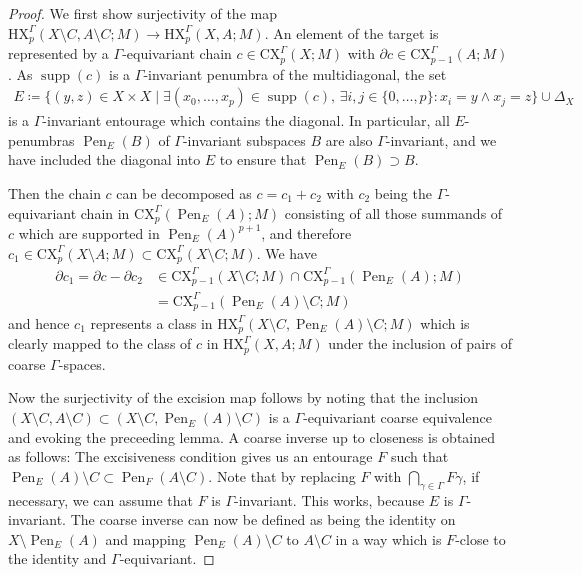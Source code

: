 \documentclass[pdftex]{sigma}
\numberwithin{equation}{section}
\theoremstyle{definition}
\newcommand{\Diag}[1][]{{\Delta_{#1}}}
\DeclareMathOperator{\supp}{supp}
\DeclareMathOperator{\Pen}{Pen}
\newcommand{\HX}{\mathrm{HX}}
\newcommand{\CX}{\mathrm{CX}}
\begin{document}
\begin{proof}
We first show surjectivity of the map \(\HX^\Gamma_p(X\setminus C,A\setminus C;M)\to\HX^\Gamma_p(X,A;M)\). An element of the target is represented by a $\Gamma$-equivariant chain $c\in\CX^\Gamma_p(X;M)$ with $\partial c\in \CX^\Gamma_{p-1}(A;M)$. As $\supp(c)$ is a $\Gamma$-invariant penumbra of the multidiagonal, the set
\begin{align*}
E\coloneqq\{(y,z)\in X\times X\mid \exists (x_0,\dots,x_p)\in \supp(c),\,
\exists i,j\in\{0,\dots,p\}\colon x_i=y\wedge x_j=z\}\cup\Diag[X]
\end{align*}
is a $\Gamma$-invariant entourage which contains the diagonal. In particular, all $E$-penumbras $\Pen_E(B)$ of $\Gamma$-invariant subspaces $B$ are also $\Gamma$-invariant, and we have included the diagonal into $E$ to ensure that $\Pen_E(B)\supset B$.

Then the chain $c$ can be decomposed as $c=c_1+c_2$ with $c_2$ being the $\Gamma$-equivariant chain in $\CX^\Gamma_p(\Pen_E(A);M)$ consisting of all those summands of $c$ which are supported in $\Pen_E(A)^{p+1}$, and therefore $c_1\in\CX^\Gamma_p(X\setminus A;M)\subset \CX^\Gamma_p(X\setminus C;M)$.
We have
\begin{align*}
\partial c_1=\partial c-\partial c_2 &\in \CX^\Gamma_{p-1}(X\setminus C;M)\cap\CX^\Gamma_{p-1}(\Pen_E(A);M)
\\&= \CX^\Gamma_{p-1}(\Pen_E(A)\setminus C;M)
\end{align*}
and hence $c_1$ represents a class in
\(\HX^\Gamma_p(X\setminus C,\Pen_E(A)\setminus C;M)\)
which is clearly mapped to the class of $c$ in $\HX^\Gamma_p(X,A;M)$ under the inclusion of pairs of coarse $\Gamma$-spaces.

Now the surjectivity of the excision map follows by noting that the inclusion $(X\setminus C,A\setminus C)\subset (X\setminus C,\Pen_E(A)\setminus C)$ is a $\Gamma$-equivariant coarse equivalence and evoking the preceeding lemma. A coarse inverse up to closeness is obtained as follows: The excisiveness condition gives us an entourage $F$ such that
\(\Pen_E(A)\setminus C\subset \Pen_F(A\setminus C)\).
Note that by replacing $F$ with $\bigcap_{\gamma\in\Gamma} F\gamma$, if necessary, we can assume that $F$ is $\Gamma$-invariant. This works, because $E$ is $\Gamma$-invariant. The coarse inverse can now be defined as being the identity on $X\setminus \Pen_E(A)$ and mapping $\Pen_E(A)\setminus C$ to $A\setminus C$ in a way which is $F$-close to the identity and $\Gamma$-equivariant.


\end{proof}
\end{document}
